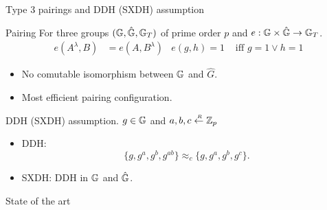 \begin{frame}{Type 3 pairings and DDH (SXDH) assumption}
  \begin{block}{Pairing}
    For three groups $(\mathbb{G}, \hat{\mathbb{G}}, \mathbb{G}_T)$ of prime order $p$ and $e: \mathbb{G} \times \hat{\mathbb{G}} \to \mathbb{G}_T$.
    \begin{align*}
      e(A^{\lambda}, B) &= e(A, B^{\lambda}) & e(g,h) = 1 &\mbox{ iff } g=1 \vee h=1 
    \end{align*}
    \pause
    \begin{itemize}
    \item No comutable isomorphism between $\mathbb{G}$ and $\hat{G}$.
      \pause
    \item Most efficient pairing configuration.
    \end{itemize}
  \end{block}
  \pause
  \begin{block}{DDH (SXDH) assumption}.
    $g \in \mathbb{G}$ and $a,b,c \stackrel{{\scriptscriptstyle \mkern4mu R}}{\gets} \mathbb{Z}_p$
 
    \begin{itemize}
    \item DDH:
      $$\{g,g^a, g^b, g^{ab}\} \approx_c \{g, g^a, g^b, g^c\}.$$
    \item SXDH: DDH in $\mathbb{G}$ and $\hat{\mathbb{G}}$.
    \end{itemize}
  \end{block}
 
\end{frame}


\begin{frame}{State of the art}

\end{frame}
